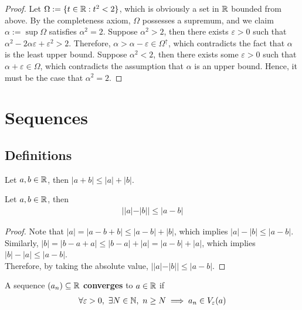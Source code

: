 \documentclass[11pt]{article}
\begin{document}
	\begin{proof}
		Let $\Omega := \{t \in \mathbb{R}: t^2 < 2\}$, which is obviously a set in $\mathbb{R}$ bounded from above. By the completeness axiom, $\Omega$ possesses a supremum, and we claim $\alpha := \sup \Omega$ satisfies $\alpha^2 = 2$. Suppose $\alpha^2 > 2$, then there exists $\varepsilon > 0$ such that $\alpha^2 - 2 \alpha \varepsilon + \varepsilon^2 > 2$. Therefore, $\alpha > \alpha - \varepsilon \in \Omega^\uparrow$, which contradicts the fact that $\alpha$ is the least upper bound. Suppose $\alpha^2 < 2$, then there exists some $\varepsilon > 0$ such that $\alpha + \varepsilon \in \Omega$, which contradicts the assumption that $\alpha$ is an upper bound. Hence, it must be the case that $\alpha^2 = 2$.
	\end{proof}
	
	\section{Sequences}
	\subsection{Definitions}
	\begin{theorem}
		Let $a, b \in \mathbb{R}$, then $|a + b| \leq |a| + |b|$.
	\end{theorem}
	
	\begin{corollary}
		Let $a, b \in \mathbb{R}$, then
		\begin{align}
			| |a| - |b| | \leq |a - b|
		\end{align}
	\end{corollary}
	
	\begin{proof}
		Note that $|a| = |a - b + b| \leq |a - b| + |b|$, which implies $|a| - |b| \leq |a - b|$. \\
		Similarly, $|b| = |b - a + a| \leq |b - a| + |a| = |a - b| + |a|$, which implies $|b| - |a| \leq |a - b|$. \\
		Therefore, by taking the absolute value, $||a| - |b|| \leq |a - b|$.
	\end{proof}
	
	\begin{definition}
		A sequence $(a_n) \subseteq \mathbb{R}$ \textbf{converges} to $a \in \mathbb{R}$ if 
		\begin{align}
			\forall \varepsilon > 0,\ \exists N \in \mathbb{N},\ n \geq N \implies a_n \in V_\varepsilon(a)
		\end{align}
	\end{definition}
	
\end{document}
